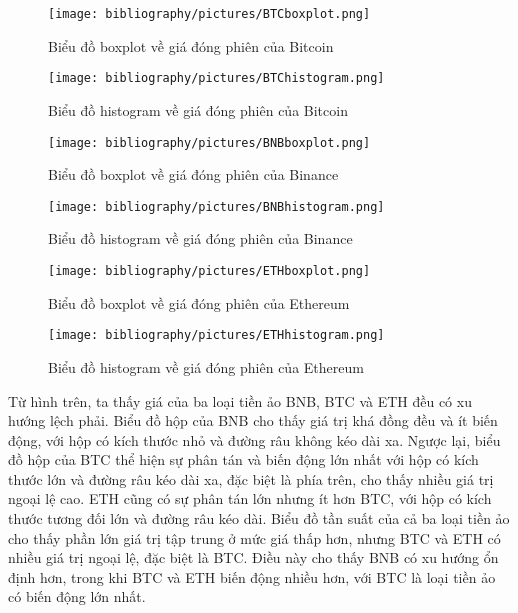 \begin{figure}[H]
    \centering
    \begin{minipage}{0.23\textwidth}
    \centering
    \texttt{[image: bibliography/pictures/BTCboxplot.png]}
    \caption{Biểu đồ boxplot về giá đóng phiên của Bitcoin}
    \label{fig:1}
    \end{minipage}
    \hfill
    \begin{minipage}{0.23\textwidth}
    \centering
    \texttt{[image: bibliography/pictures/BTChistogram.png]}
    \caption{Biểu đồ histogram về giá đóng phiên của Bitcoin}
    \label{fig:2}
    \end{minipage}
\end{figure}

\begin{figure}[H]
    \centering
    \begin{minipage}{0.23\textwidth}
    \centering
    \texttt{[image: bibliography/pictures/BNBboxplot.png]}
    \caption{Biểu đồ boxplot về giá đóng phiên của Binance}
    \label{fig:1}
    \end{minipage}
    \hfill
    \begin{minipage}{0.23\textwidth}
    \centering
    \texttt{[image: bibliography/pictures/BNBhistogram.png]}
    \caption{Biểu đồ histogram về giá đóng phiên của Binance}
    \label{fig:2}
    \end{minipage}
\end{figure}

\begin{figure}[H]
    \centering
    \begin{minipage}{0.23\textwidth}
    \centering
    \texttt{[image: bibliography/pictures/ETHboxplot.png]}
    \caption{Biểu đồ boxplot về giá đóng phiên của Ethereum}
    \label{fig:1}
    \end{minipage}
    \hfill
    \begin{minipage}{0.23\textwidth}
    \centering
    \texttt{[image: bibliography/pictures/ETHhistogram.png]}
    \caption{Biểu đồ histogram về giá đóng phiên của Ethereum}
    \label{fig:2}
    \end{minipage}
\end{figure}

Từ hình trên, ta thấy giá của ba loại tiền ảo BNB, BTC và ETH đều có xu hướng lệch phải. Biểu đồ hộp của BNB cho thấy giá trị khá đồng đều và ít biến động, với hộp có kích thước nhỏ và đường râu không kéo dài xa. Ngược lại, biểu đồ hộp của BTC thể hiện sự phân tán và biến động lớn nhất với hộp có kích thước lớn và đường râu kéo dài xa, đặc biệt là phía trên, cho thấy nhiều giá trị ngoại lệ cao. ETH cũng có sự phân tán lớn nhưng ít hơn BTC, với hộp có kích thước tương đối lớn và đường râu kéo dài. Biểu đồ tần suất của cả ba loại tiền ảo cho thấy phần lớn giá trị tập trung ở mức giá thấp hơn, nhưng BTC và ETH có nhiều giá trị ngoại lệ, đặc biệt là BTC. Điều này cho thấy BNB có xu hướng ổn định hơn, trong khi BTC và ETH biến động nhiều hơn, với BTC là loại tiền ảo có biến động lớn nhất.